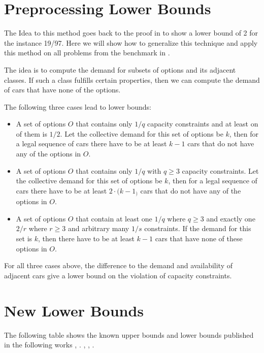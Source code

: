 \documentclass[]{llncs}
\begin{document}
\section{Preprocessing Lower Bounds}

The Idea to this method goes back to the proof in \cite{Gent98} to show a lower bound of 2 for the instance 19/97. Here
we will show how to generalize this technique and apply this method on all problems from the benchmark in \cite{Gravel05}. 

The idea is to compute the demand for subsets of options and its adjacent classes. If such a class fulfills certain
properties, then we can compute the demand of cars that have none of the options. 


The following three cases lead to lower bounds: 

\begin{itemize}
    \item A set of options $O$ that contains only $1/q$ capacity constraints and at least on of them is $1/2$. Let the
        collective demand for this set of options be $k$, then for a legal sequence of cars there have to be at least
        $k-1$ cars that do not have any of the options in $O$. 
    \item A set of options $O$ that contains only $1/q$ with $q \geq 3$ capacity constraints. Let the collective demand
        for this set of options be $k$, then for a legal sequence of cars there have to be at least $2\cdot (k-1_)$ cars
        that do not have any of the options in $O$. 
    \item A set of options $O$ that contain at least one $1/q$ where $q \geq 3$ and exactly one $2/r$ where $r \geq 3$
        and arbitrary many $1/s$ constraints. If the demand for this set is $k$, then there have to be at least $k-1$ cars
        that have none of these options in $O$. 
\end{itemize}

\begin{proposition}
    For all three cases above, the difference to the demand and availability of adjacent cars give a lower bound on
    the violation of capacity constraints.
\end{proposition}


\section{New Lower Bounds}

The following table shows the known upper bounds and lower bounds published in the following works \cite{Regin97},
\cite{Gent98}. \cite{Gottlieb03}, \cite{Gravel05}, \cite{Estellon06}.

\begin{table}[htbp]
    \caption{}
    \centering
    
    \label{tab:1}
\end{table}



\end{document}
